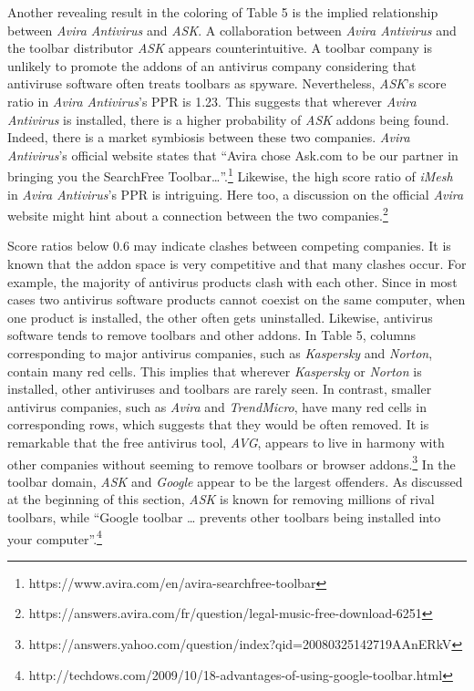 \documentclass{article} %
\begin{document}
Another revealing result in the coloring of Table 5 is the implied relationship between \textit{Avira Antivirus} and \textit{ASK}. A collaboration between \textit{Avira Antivirus} and the toolbar distributor \textit{ASK} appears counterintuitive. A toolbar company is unlikely to promote the addons of an antivirus company considering that antiviruse software often treats toolbars as spyware. Nevertheless, \textit{ASK}'s score ratio in \textit{Avira Antivirus}'s PPR is 1.23. This suggests that wherever \textit{Avira} \textit{Antivirus} is installed, there is a higher probability of \textit{ASK} addons being found. Indeed, there is a market symbiosis between these two companies. \textit{Avira Antivirus}'s official website states that ``Avira chose Ask.com to be our partner in bringing you the SearchFree Toolbar{\dots}''.\footnote{ https://www.avira.com/en/avira-searchfree-toolbar} Likewise, the high score ratio of \textit{iMesh} in \textit{Avira Antivirus}'s PPR is intriguing. Here too, a discussion on the official \textit{Avira} website might hint about a connection between the two companies.\footnote{ https://answers.avira.com/fr/question/legal-music-free-download-6251}

Score ratios below 0.6 may indicate clashes between competing companies. It is known that the addon space is very competitive and that many clashes occur. For example, the majority of antivirus products clash with each other. Since in most cases two antivirus software products cannot coexist on the same computer, when one product is installed, the other often gets uninstalled. Likewise, antivirus software tends to remove toolbars and other addons. In Table 5, columns corresponding to major antivirus companies, such as \textit{Kaspersky} and \textit{Norton}, contain many red cells. This implies that wherever \textit{Kaspersky} or \textit{Norton} is installed, other antiviruses and toolbars are rarely seen. In contrast, smaller antivirus companies, such as \textit{Avira} and \textit{TrendMicro}, have many red cells in corresponding rows, which suggests that they would be often removed. It is remarkable that the free antivirus tool, \textit{AVG}, appears to live in harmony with other companies without seeming to remove toolbars or browser addons.\footnote{ https://answers.yahoo.com/question/index?qid=20080325142719AAnERkV} In the toolbar domain, \textit{ASK} and \textit{Google} appear to be the largest offenders. As discussed at the beginning of this section, \textit{ASK} is known for removing millions of rival toolbars, while ``Google toolbar {\dots} prevents other toolbars being installed into your computer''.\footnote{ http://techdows.com/2009/10/18-advantages-of-using-google-toolbar.html} 
\end{document}
